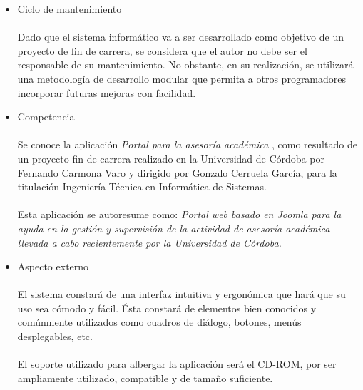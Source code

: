 \begin{itemize}
 \item Ciclo de mantenimiento

   \paragraph{}Dado que el sistema informático va a ser desarrollado como
   objetivo de un proyecto de fin de carrera, se considera que el autor no debe
   ser el responsable de su mantenimiento. No obstante, en su realización, se
   utilizará una metodología de desarrollo modular que permita a otros
   programadores incorporar futuras mejoras con facilidad.

 \item Competencia

   \paragraph{}Se conoce la aplicación \textit{Portal para la asesoría
   académica} \cite{carmonaVaro}, como resultado de un proyecto fin de carrera
   realizado en la Universidad de Córdoba por Fernando Carmona Varo
   y dirigido por Gonzalo Cerruela García, para la titulación Ingeniería
   Técnica en Informática de Sistemas.

   \paragraph{}Esta aplicación se autoresume como:
   \textit{Portal web basado en Joomla para la ayuda en la gestión y supervisión
   de la actividad de asesoría académica llevada a cabo recientemente por la
   Universidad de Córdoba.}

 \item Aspecto externo

   \paragraph{}El sistema constará de una interfaz intuitiva y ergonómica que
   hará que su uso sea cómodo y fácil. Ésta constará de elementos bien conocidos
   y comúnmente utilizados como cuadros de diálogo, botones, menús desplegables,
   etc.

   \paragraph{}El soporte utilizado para albergar la aplicación será el CD-ROM,
   por ser ampliamente utilizado, compatible y de tamaño suficiente.


\end{itemize}
